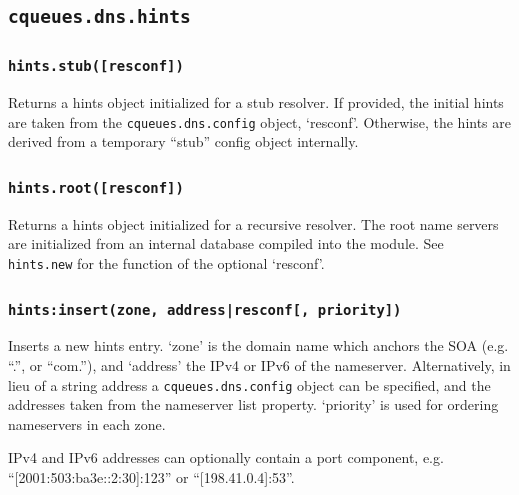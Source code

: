 \documentclass[11pt, oneside]{memoir}
\newcommand*{\fn}[1]{\texttt{#1}\xspace}
\newcommand*{\module}[1]{\texttt{#1}\xspace}
\newcounter{toccols}
\newenvironment{Module}[1]{
	\subsection{\texttt{#1}}
	\addtocontents{toc}{
		\protect\begin{multicols}{\value{toccols}}
	}
}{
	\addtocontents{toc}{\protect\end{multicols}}
}
\begin{document}
\begin{Module}{cqueues.dns.hints}
\subsubsection[\fn{hints.stub}]{\fn{hints.stub([resconf])}}

Returns a hints object initialized for a stub resolver. If provided, the initial hints are taken from the \module{cqueues.dns.config} object,  `resconf'. Otherwise, the hints are derived from a temporary ``stub'' config object internally.

\subsubsection[\fn{hints.root}]{\fn{hints.root([resconf])}}

Returns a hints object initialized for a recursive resolver. The root name servers are initialized from an internal database compiled into the module. See \fn{hints.new} for the function of the optional `resconf'.

\subsubsection[\fn{hints:insert}]{\fn{hints:insert(zone, address|resconf[, priority])}}

Inserts a new hints entry. `zone' is the domain name which anchors the SOA (e.g. ``.'', or ``com.''), and `address' the IPv4 or IPv6 of the nameserver. Alternatively, in lieu of a string address a \module{cqueues.dns.config} object can be specified, and the addresses taken from the nameserver list property. `priority' is used for ordering  nameservers in each zone.

IPv4 and IPv6 addresses can optionally contain a port component, e.g. ``[2001:503:ba3e::2:30]:123'' or ``[198.41.0.4]:53''.

\end{Module}
\end{document}
